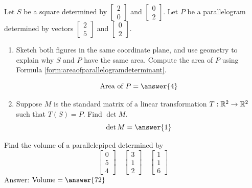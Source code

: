 \documentclass{ximera}
\begin{document}
\begin{problem}\label{prob:areasquareandparal} Let $S$ be a square determined by $\begin{bmatrix}2\\0\end{bmatrix}$ and $\begin{bmatrix}0\\2\end{bmatrix}$.  Let $P$ be a parallelogram determined by vectors $\begin{bmatrix}2\\5\end{bmatrix}$ and $\begin{bmatrix}0\\2\end{bmatrix}$.  
\begin{enumerate}
\item Sketch both figures in the same coordinate plane, and use geometry to explain why $S$ and $P$ have the same area.  Compute the area of $P$ using Formula \ref{form:areaofparallelogramdeterminant}.

$$\text{Area of }P=\answer{4}$$
\item Suppose $M$ is the standard matrix of a linear transformation $T:\mathbb{R}^2\rightarrow\mathbb{R}^2$ such that $T(S)=P$.  Find $\det M$.
$$\det M=\answer{1}$$
\end{enumerate}
\end{problem}


\begin{problem}\label{prob:volparallelepiped}
Find the volume of a parallelepiped determined by 
$$\begin{bmatrix}0\\5\\4\end{bmatrix}\quad\begin{bmatrix}3\\1\\2\end{bmatrix}\quad\begin{bmatrix}1\\1\\6\end{bmatrix}$$
Answer: $\mbox{Volume}=\answer{72}$
\end{problem}
\end{document}

